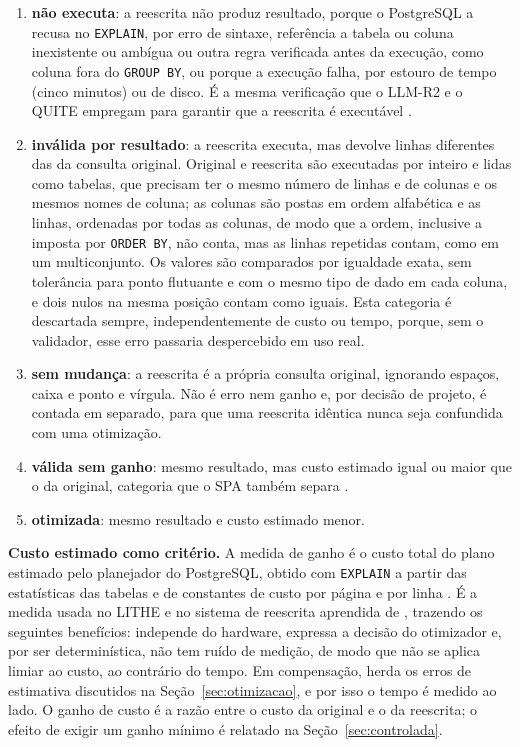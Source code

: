 \documentclass[12pt]{article}
\begin{document}
\begin{enumerate}[leftmargin=*]
\item \textbf{não executa}: a reescrita não produz resultado, porque o PostgreSQL a recusa no \texttt{EXPLAIN}, por erro de sintaxe, referência a tabela ou coluna inexistente ou ambígua ou outra regra verificada antes da execução, como coluna fora do \texttt{GROUP BY}, ou porque a execução falha, por estouro de tempo (cinco minutos) ou de disco. É a mesma verificação que o LLM-R2 e o QUITE empregam para garantir que a reescrita é executável \cite{li2024llmr2,song2025quite}.
\item \textbf{inválida por resultado}: a reescrita executa, mas devolve linhas diferentes das da consulta original. Original e reescrita são executadas por inteiro e lidas como tabelas, que precisam ter o mesmo número de linhas e de colunas e os mesmos nomes de coluna; as colunas são postas em ordem alfabética e as linhas, ordenadas por todas as colunas, de modo que a ordem, inclusive a imposta por \texttt{ORDER BY}, não conta, mas as linhas repetidas contam, como em um multiconjunto. Os valores são comparados por igualdade exata, sem tolerância para ponto flutuante e com o mesmo tipo de dado em cada coluna, e dois nulos na mesma posição contam como iguais. Esta categoria é descartada sempre, independentemente de custo ou tempo, porque, sem o validador, esse erro passaria despercebido em uso real.
\item \textbf{sem mudança}: a reescrita é a própria consulta original, ignorando espaços, caixa e ponto e vírgula. Não é erro nem ganho e, por decisão de projeto, é contada em separado, para que uma reescrita idêntica nunca seja confundida com uma otimização.
\item \textbf{válida sem ganho}: mesmo resultado, mas custo estimado igual ou maior que o da original, categoria que o SPA também separa \cite{huang2026spa}.
\item \textbf{otimizada}: mesmo resultado e custo estimado menor.
\end{enumerate}

\textbf{Custo estimado como critério.} A medida de ganho é o custo total do plano estimado pelo planejador do PostgreSQL, obtido com \texttt{EXPLAIN} a partir das estatísticas das tabelas e de constantes de custo por página e por linha \cite{postgresql14explain,postgresql14cost}. É a medida usada no LITHE \cite{dharwada2026lithe} e no sistema de reescrita aprendida de \textcite{zhou2021learnedrewrite}, trazendo os seguintes benefícios: independe do hardware, expressa a decisão do otimizador e, por ser determinística, não tem ruído de medição, de modo que não se aplica limiar ao custo, ao contrário do tempo. Em compensação, herda os erros de estimativa discutidos na Seção~\ref{sec:otimizacao}, e por isso o tempo é medido ao lado. O ganho de custo é a razão entre o custo da original e o da reescrita; o efeito de exigir um ganho mínimo é relatado na Seção~\ref{sec:controlada}.
\end{document}
